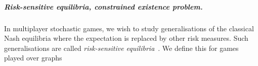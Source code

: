 













\subparagraph{Risk-sensitive equilibria, constrained existence problem.}
In multiplayer stochastic games, we wish to study generalisations of the classical Nash equilibria where the expectation is replaced by other risk measures.
Such generalisations are called \emph{risk-sensitive equilibria}~\cite{Now05}. We define this for games played over graphs

